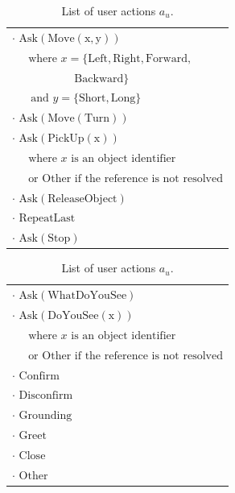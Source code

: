 \begin{table}[p!]
\begin{footnotesize}
\begin{tabular}{p{60mm}} 
$\cdot$ $\mathrm{Ask(Move(x,y))} $ \\ $ \ \ \ \ \ \text{ where } x=\{\mathrm{Left,Right,Forward,}$ \\ $\ \ \ \ \ \ \ \ \ \ \ \ \ \ \ \ \ \ \ \ \ \ \ \ \ \mathrm{Backward}\} $ \\ $ \ \ \ \ \ \ \text{ and } y = \{\mathrm{Short,Long}\}$ \\
$\cdot$ $\mathrm{Ask(Move(Turn))} $ \\
$\cdot$ $\mathrm{Ask(PickUp(x))} $ \\ $\ \ \ \ \  \text{ where } x \text{ is an object identifier}$ \\ $\ \ \ \ \  \text{ or }  \mathrm{Other} \text{ if the reference is not resolved}$ \\
$\cdot$ $\mathrm{Ask(ReleaseObject)} $ \\
$\cdot$ $\mathrm{RepeatLast}$ \\
$\cdot$ $\mathrm{Ask(Stop)}$ 
\end{tabular}
\hspace{2cm}
\begin{tabular}{p{60mm}} 
$\cdot$ $\mathrm{Ask(WhatDoYouSee)}$ \\
$\cdot$ $\mathrm{Ask(DoYouSee(x))} $ \\ $\ \ \ \ \  \text{ where } x \text{ is an object identifier }$ \\ $\ \ \ \ \  \text{ or }  \mathrm{Other} \text{ if the reference is not resolved}$ \\
$\cdot$ $\mathrm{Confirm}$ \\
$\cdot$ $\mathrm{Disconfirm}$ \\
$\cdot$ $\mathrm{Grounding}$ \\
$\cdot$ $\mathrm{Greet}$ \\
$\cdot$ $\mathrm{Close}$ \\
$\cdot$ $\mathrm{Other}$ 
\end{tabular}
\end{footnotesize}
 \caption{List of user actions $a_u$.} 
\label{table:userdas_exp3}
\end{table}

